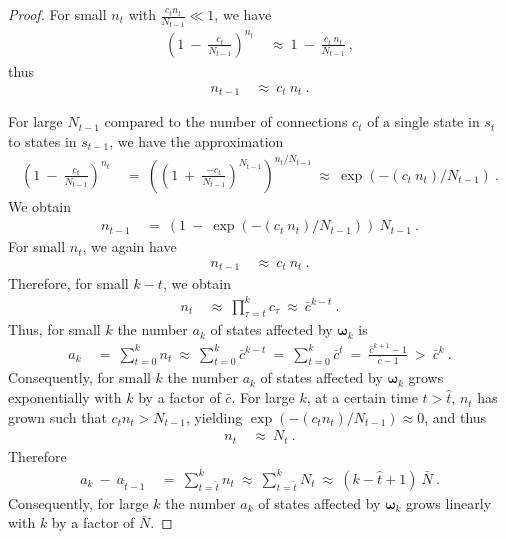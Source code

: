 \documentclass{article}
\newcommand\Bom{\bm{\omega}}
\begin{document}
\begin{appendices}
\begin{proof}
For small $n_t$ with $\frac{c_t  n_t}{N_{t-1}} \ll 1$, we have
\begin{align}
  \left( 1 \ - \ \frac{c_t}{N_{t-1}} \right)^{n_t} \ &\approx \ 1 \ -
  \ \frac{c_t \ n_t}{N_{t-1}} \ ,
\end{align}
thus
\begin{align}
 n_{t-1}   \ &\approx \  c_t \ n_t \ .
\end{align}

For large $N_{t-1}$ compared to the number of connections $c_t$ of a
single state in $s_t$ to states in $s_{t-1}$,
we have the approximation
\begin{align}
  \left( 1 \ - \ \frac{c_t}{N_{t-1}} \right)^{n_t} \ &= \
  \left( \left( 1 \ + \ \frac{-c_t}{N_{t-1}} \right)^{N_{t-1}} \right)^{n_t/N_{t-1}} \ \approx \
  \exp(- (c_t \ n_t)/N_{t-1}) \ .
\end{align}
We obtain
\begin{align}
n_{t-1}   \ &= \ \left( 1 \ - \  \exp(-(c_t \ n_t)/N_{t-1}) \right) \ N_{t-1} \ .
\end{align}
For small $n_t$, we again have
\begin{align}
  n_{t-1}   \ &\approx \ c_t \ n_t \ .
\end{align}
Therefore, for small $k-t$, we obtain
\begin{align}
  n_{t}   \ &\approx \ \prod_{\tau=t}^k c_{\tau}  \ \approx \ \bar{c}^{k-t}\ .
\end{align}
Thus, for small $k$ the number $a_k$ of states affected by $\Bom_k$ is
\begin{align}
  a_k \ &= \ \sum_{t=0}^k n_t \ \approx \  \sum_{t=0}^k \bar{c}^{k-t}
  \ = \ \sum_{t=0}^k \bar{c}^t \ = \ \frac{\bar{c}^{k+1}-1}{\bar{c}-1} \ >
  \ \bar{c}^k \ .
\end{align}
Consequently, for small $k$ the number $a_k$ of states affected by $\Bom_k$ grows exponentially with $k$ by a factor of $\bar{c}$.  
For large $k$, at a certain time $t>\hat{t}$, $n_t$ has grown such that
$c_t n_t > N_{t-1}$, yielding
$\exp(-(c_t n_t)/N_{t-1}) \approx 0$, and thus
\begin{align}
  n_t   \ &\approx \  N_t \ .
\end{align}
Therefore 
\begin{align}
  a_k \ - \ a_{\hat{t}-1} \ &= \ \sum_{t=\hat{t}}^k n_t \ \approx \  \sum_{t=\hat{t}}^k N_{t} \
  \approx \ (k-\hat{t}+1) \ \bar{N} \ .
\end{align}
Consequently, for large $k$ the number $a_k$ of states affected by
$\Bom_k$ grows linearly with $k$ by a factor of $\bar{N}$.  
\end{proof}


\end{appendices}
\end{document}
